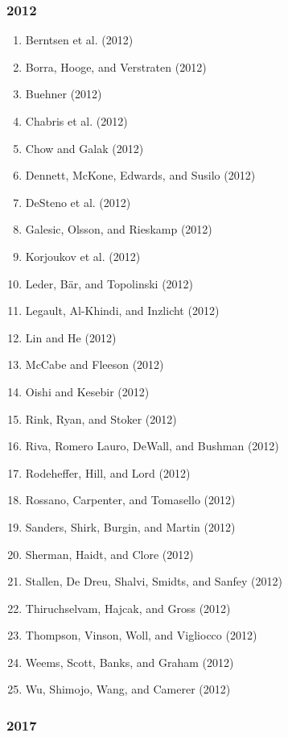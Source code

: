 \documentclass[english,man]{apa6}
\providecommand{\tightlist}{%
  \setlength{\itemsep}{0pt}\setlength{\parskip}{0pt}}
\begin{document}
\subsubsection{2012}\label{section-42}

\begin{enumerate}
\def\labelenumi{\arabic{enumi})}
\tightlist
\item
  Berntsen et al. (2012)
\item
  Borra, Hooge, and Verstraten (2012)
\item
  Buehner (2012)
\item
  Chabris et al. (2012)
\item
  Chow and Galak (2012)
\item
  Dennett, McKone, Edwards, and Susilo (2012)
\item
  DeSteno et al. (2012)
\item
  Galesic, Olsson, and Rieskamp (2012)
\item
  Korjoukov et al. (2012)
\item
  Leder, Bär, and Topolinski (2012)
\item
  Legault, Al-Khindi, and Inzlicht (2012)
\item
  Lin and He (2012)
\item
  McCabe and Fleeson (2012)
\item
  Oishi and Kesebir (2012)
\item
  Rink, Ryan, and Stoker (2012)
\item
  Riva, Romero Lauro, DeWall, and Bushman (2012)
\item
  Rodeheffer, Hill, and Lord (2012)
\item
  Rossano, Carpenter, and Tomasello (2012)
\item
  Sanders, Shirk, Burgin, and Martin (2012)
\item
  Sherman, Haidt, and Clore (2012)
\item
  Stallen, De Dreu, Shalvi, Smidts, and Sanfey (2012)
\item
  Thiruchselvam, Hajcak, and Gross (2012)
\item
  Thompson, Vinson, Woll, and Vigliocco (2012)
\item
  Weems, Scott, Banks, and Graham (2012)
\item
  Wu, Shimojo, Wang, and Camerer (2012)
\end{enumerate}

\subsubsection{2017}\label{section-43}
\end{document}
